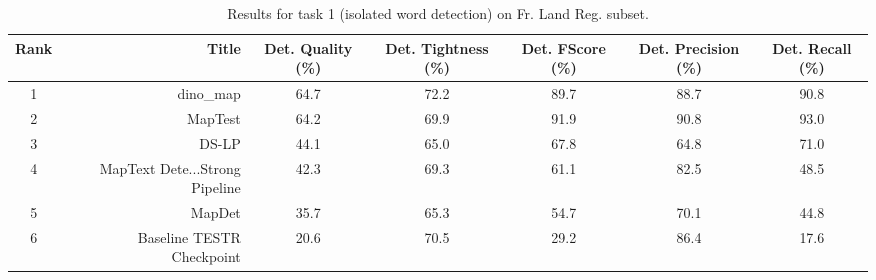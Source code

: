 \begin{table}
\caption{Results for task 1 (isolated word detection) on Fr. Land Reg. subset.}
\begin{tabular}{crccccc}
\toprule
Rank & Title & Det. Quality (\%) & Det. Tightness (\%) & Det. FScore (\%) & Det. Precision (\%) & Det. Recall (\%) \\
\midrule
1 & dino_map & 64.7 & 72.2 & 89.7 & 88.7 & 90.8 \\
2 & MapTest & 64.2 & 69.9 & 91.9 & 90.8 & 93.0 \\
3 & DS-LP & 44.1 & 65.0 & 67.8 & 64.8 & 71.0 \\
4 & MapText Dete...Strong Pipeline & 42.3 & 69.3 & 61.1 & 82.5 & 48.5 \\
5 & MapDet & 35.7 & 65.3 & 54.7 & 70.1 & 44.8 \\
6 & Baseline TESTR Checkpoint & 20.6 & 70.5 & 29.2 & 86.4 & 17.6 \\
\bottomrule
\end{tabular}
\end{table}
